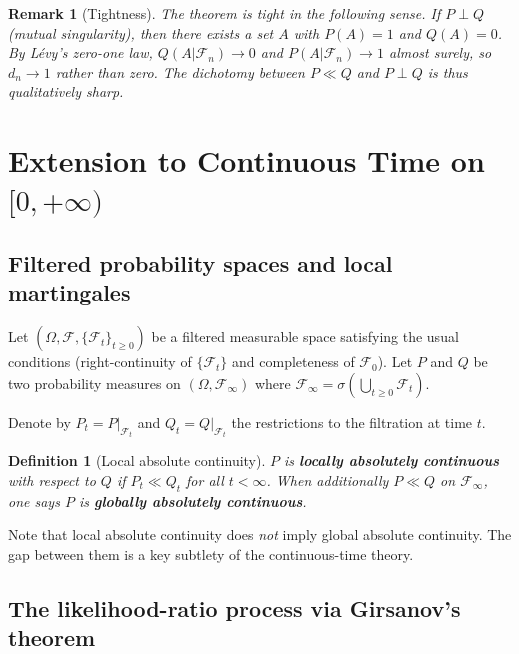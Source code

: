 \documentclass[12pt]{article}
\newtheorem{definition}[theorem]{Definition}
\newtheorem{remark}[theorem]{Remark}
\begin{document}
\begin{remark}[Tightness]
The theorem is tight in the following sense.  If $P \perp Q$ (mutual
singularity), then there exists a set $A$ with $P(A) = 1$ and $Q(A) = 0$.
By Lévy's zero-one law, $Q(A|\mathscr{F}_n) \to 0$ and
$P(A|\mathscr{F}_n) \to 1$ almost surely, so $d_n \to 1$ rather
than zero.  The dichotomy between $P \ll Q$ and $P \perp Q$ is thus
qualitatively sharp.
\end{remark}

\section{Extension to Continuous Time on $[0, +\infty)$}
\label{sec:CT}

\subsection{Filtered probability spaces and local martingales}

Let $(\Omega, \mathscr{F}, \{\mathscr{F}_t\}_{t \geq 0})$ be a filtered
measurable space satisfying the usual conditions (right-continuity of
$\{\mathscr{F}_t\}$ and completeness of $\mathscr{F}_0$).  Let $P$ and $Q$
be two probability measures on $(\Omega, \mathscr{F}_\infty)$ where
$\mathscr{F}_\infty = \sigma(\bigcup_{t \geq 0} \mathscr{F}_t)$.

Denote by $P_t = P|_{\mathscr{F}_t}$ and $Q_t = Q|_{\mathscr{F}_t}$ the
restrictions to the filtration at time $t$.

\begin{definition}[Local absolute continuity]
$P$ is \textbf{locally absolutely continuous} with respect to $Q$ if
$P_t \ll Q_t$ for all $t < \infty$.  When additionally $P \ll Q$ on
$\mathscr{F}_\infty$, one says $P$ is \textbf{globally absolutely continuous}.
\end{definition}

\noindent Note that local absolute continuity does \emph{not} imply global
absolute continuity.  The gap between them is a key subtlety of the
continuous-time theory.

\subsection{The likelihood-ratio process via Girsanov's theorem}
\end{document}
